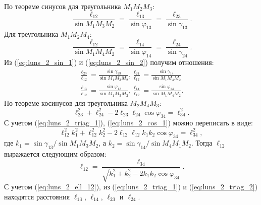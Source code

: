 \documentclass[a4paper,12pt]{article}
\begin{document}
По теореме синусов для треугольника $M_1 M_2 M_3$:
\begin{equation}\label{eq:luns_2_sin_1}
    \frac{\ell_{12}}{\sin{M_1 M_3 M_2}} = \frac{\ell_{13}}{\sin{\varphi_{13}}} = \frac{\ell_{23}}{\sin{\gamma_{13}}}.
\end{equation}
Для треугольника $M_1 M_2 M_4$:
\begin{equation}\label{eq:luns_2_sin_2}
    \frac{\ell_{12}}{\sin{M_1 M_4 M_2}} = \frac{\ell_{14}}{\sin{\varphi_{14}}} = \frac{\ell_{24}}{\sin{\gamma_{24}}}.
\end{equation}
Из (\ref{eq:luns_2_sin_1}) и (\ref{eq:luns_2_sin_2}) получим отношения:
\begin{align}
     \frac{\ell_{23}}{\ell_{12}} = \frac{\sin{\gamma_{13}}}{\sin{M_1 M_3 M_2}}, \frac{\ell_{24}}{\ell_{12}} = \frac{\sin{\gamma_{14}}}{\sin{M_1 M_4 M_2}} \label{eq:luns_2_triag_1}\\
     \frac{\ell_{13}}{\ell_{12}} = \frac{\sin{\varphi_{13}}}{\sin{M_1 M_3 M_2}}, \frac{\ell_{14}}{\ell_{12}} = \frac{\sin{\varphi_{14}}}{\sin{M_1 M_4 M_2}} \label{eq:luns_2_triag_2}.
\end{align}
По теореме косинусов для треугольника $M_2 M_4 M_3$:
\begin{equation}\label{eq:luns_2_cos_1}
    \ell_{23}^2 + \ell_{24}^2 - 2 \ell_{23} \ell_{24} \cos\varphi_{34} = \ell_{34}^2.
\end{equation}
С учетом (\ref{eq:luns_2_triag_1}), (\ref{eq:luns_2_cos_1}) можно переписать в виде:
\begin{equation}
    \ell_{12}^2 k_1^2 + \ell_{12}^2 k_2^2 - 2 \ell_{12} \ell_{12} k_1 k_2 \cos\varphi_{34} = \ell_{34}^2,
\end{equation}
где $k_1 = \sin\gamma_{13} / \sin{M_1 M_3 M_2}$, а $k_2 = \sin\gamma_{14} / \sin{M_4 M_1 M_2}$.
Тогда $\ell_{12}$ выражается следующим образом:
\begin{equation}\label{eq:luns_2_ell_12}
    \ell_{12} = \frac{\ell_{34}}{\sqrt{k_1^2 + k_2 ^2 - 2 k_1 k_2 \cos\varphi_{34}}}.
\end{equation}
С учетом (\ref{eq:luns_2_ell_12}), из (\ref{eq:luns_2_triag_1}) и (\ref{eq:luns_2_triag_2}) находятся
расстояния $\ell_{13}$, $\ell_{14}$, $\ell_{23}$ и $\ell_{24}$.
\end{document}
